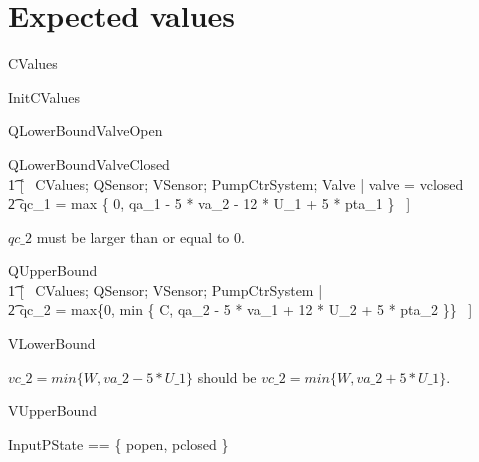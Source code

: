 \documentclass{report} %
\begin{document}
\section{Expected values}
\begin{zed}
  CValues 
\end{zed}

\begin{zed}
  InitCValues 
\end{zed}

\begin{zed}
  QLowerBoundValveOpen 
\end{zed}

\begin{zed}
  QLowerBoundValveClosed 
  \\ %
  \t1 [~ CValues; QSensor; VSensor; PumpCtrSystem; Valve | valve = vclosed \land \\
     \t2 qc\_1 = max \{ 0, qa\_1 - 5 * va\_2 - 12 * U\_1 + 5 * pta\_1 \} ~]
\end{zed}

$qc\_2$ must be larger than or equal to 0.
\begin{zed}
  QUpperBound 
  \\ %
  \t1 [~ CValues; QSensor; VSensor; PumpCtrSystem | \\ %
    \t2 qc\_2 = max\{0, min \{ C, qa\_2 - 5 * va\_1 + 12 * U\_2 + 5 * pta\_2 \}\} ~]
\end{zed}

\begin{zed}
  VLowerBound 
\end{zed}

$vc\_2 = min \{ W, va\_2 - 5 * U\_1 \}$ should be $vc\_2 = min \{ W, va\_2 + 5 * U\_1 \}$.
\begin{zed}
  VUpperBound 
\end{zed}

\begin{zed}
  InputPState == \{ popen, pclosed \}
\end{zed}
\end{document}
